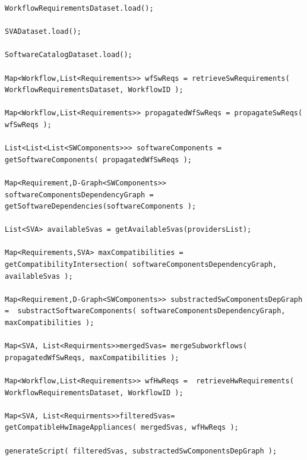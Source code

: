 \begin{lstlisting}[caption={Pseudo-code overview of the Infrastructure Specification Algorithm (ISA).},label={lst:pseudo}]
WorkflowRequirementsDataset.load();

SVADataset.load();

SoftwareCatalogDataset.load();

Map<Workflow,List<Requirements>> wfSwReqs = retrieveSwRequirements( WorkflowRequirementsDataset, WorkflowID );

Map<Workflow,List<Requirements>> propagatedWfSwReqs = propagateSwReqs( wfSwReqs );

List<List<List<SWComponents>>> softwareComponents = getSoftwareComponents( propagatedWfSwReqs );

Map<Requirement,D-Graph<SWComponents>> softwareComponentsDependencyGraph =    getSoftwareDependencies(softwareComponents );

List<SVA> availableSvas = getAvailableSvas(providersList);

Map<Requirements,SVA> maxCompatibilities = getCompatibilityIntersection( softwareComponentsDependencyGraph, availableSvas );

Map<Requirement,D-Graph<SWComponents>> substractedSwComponentsDepGraph =  substractSoftwareComponents( softwareComponentsDependencyGraph, maxCompatibilities );

Map<SVA, List<Requirments>>mergedSvas= mergeSubworkflows( propagatedWfSwReqs, maxCompatibilities );

Map<Workflow,List<Requirements>> wfHwReqs =  retrieveHwRequirements( WorkflowRequirementsDataset, WorkflowID );

Map<SVA, List<Requirments>>filteredSvas= getCompatibleHwImageAppliances( mergedSvas, wfHwReqs );

generateScript( filteredSvas, substractedSwComponentsDepGraph );
\end{lstlisting}




